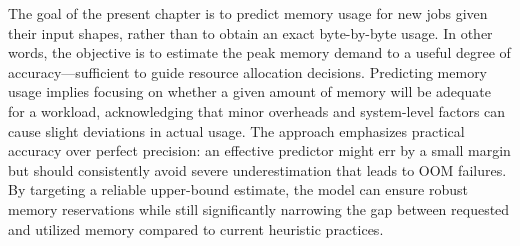 The goal of the present chapter is to predict memory usage for new jobs given their input shapes, rather than to obtain an exact byte-by-byte usage.
In other words, the objective is to estimate the peak memory demand to a useful degree of accuracy—sufficient to guide resource allocation decisions.
Predicting memory usage implies focusing on whether a given amount of memory will be adequate for a workload, acknowledging that minor overheads and system-level factors can cause slight deviations in actual usage.
The approach emphasizes practical accuracy over perfect precision: an effective predictor might err by a small margin but should consistently avoid severe underestimation that leads to \ac{OOM} failures.
By targeting a reliable upper-bound estimate, the model can ensure robust memory reservations while still significantly narrowing the gap between requested and utilized memory compared to current heuristic practices.


